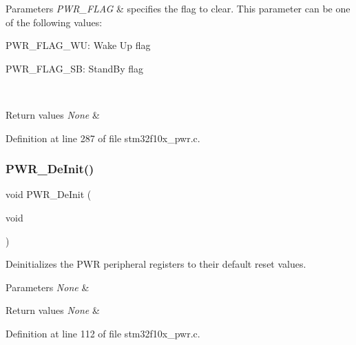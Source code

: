 \begin{DoxyParams}{Parameters}
{\em P\+W\+R\+\_\+\+F\+L\+AG} & specifies the flag to clear. This parameter can be one of the following values\+: \begin{DoxyItemize}
\item P\+W\+R\+\_\+\+F\+L\+A\+G\+\_\+\+WU\+: Wake Up flag \item P\+W\+R\+\_\+\+F\+L\+A\+G\+\_\+\+SB\+: Stand\+By flag \end{DoxyItemize}
\\
\hline
\end{DoxyParams}

\begin{DoxyRetVals}{Return values}
{\em None} & \\
\hline
\end{DoxyRetVals}


Definition at line 287 of file stm32f10x\+\_\+pwr.\+c.

\mbox{\label{group___p_w_r___exported___functions_gad03a0aac7bc3bc3a9fd012f3769a6990}} 
\subsubsection{\texorpdfstring{P\+W\+R\+\_\+\+De\+Init()}{PWR\_DeInit()}}
{\footnotesize\ttfamily void P\+W\+R\+\_\+\+De\+Init (\begin{DoxyParamCaption}\item[{void}]{ }\end{DoxyParamCaption})}



Deinitializes the P\+WR peripheral registers to their default reset values. 


\begin{DoxyParams}{Parameters}
{\em None} & \\
\hline
\end{DoxyParams}

\begin{DoxyRetVals}{Return values}
{\em None} & \\
\hline
\end{DoxyRetVals}


Definition at line 112 of file stm32f10x\+\_\+pwr.\+c.


